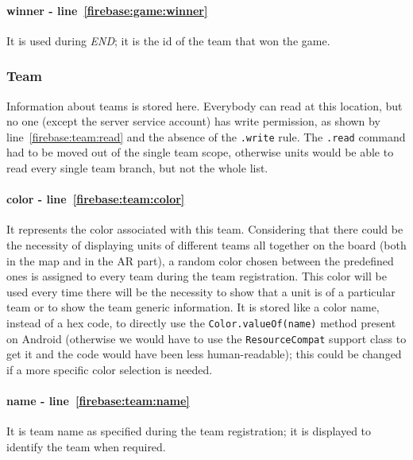 				\paragraph{winner - line~\ref{firebase:game:winner}}
				It is used during \emph{END}; it is the id of the team that won the game.
			
			\newpage
			
			\subsubsection{Team}

				
				
				Information about teams is stored here.
				Everybody can read at this location, but no one (except the server service account) has write permission, as shown by line~\ref{firebase:team:read} and the absence of the \lstinline|.write| rule.
				The \lstinline|.read| command had to be moved out of the single team scope, otherwise units would be able to read every single team branch, but not the whole list. \\
			
			
				\paragraph{color - line~\ref{firebase:team:color}}
				It represents the color associated with this team. Considering that there could be the necessity of displaying units of different teams all together on the board (both in the map and in the AR part), a random color chosen between the predefined ones is assigned to every team during the team registration. This color will be used every time there will be the necessity to show that a unit is of a particular team or to show the team generic information.
				It is stored like a color name, instead of a hex code, to directly use the \lstinline|Color.valueOf(name)| method present on Android (otherwise we would have to use the \lstinline|ResourceCompat| support class to get it and the code would have been less human-readable); this could be changed if a more specific color selection is needed.
			
				\paragraph{name - line~\ref{firebase:team:name}}
				It is team name as specified during the team registration; it is displayed to identify the team when required.
				
